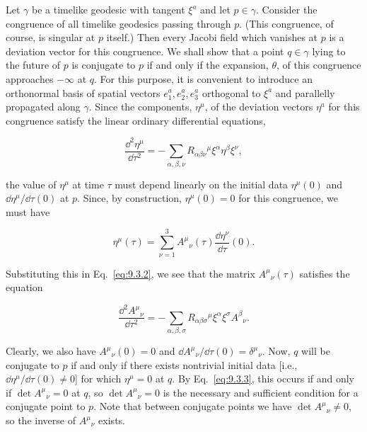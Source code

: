 Let \(\gamma\) be a timelike geodesic with tangent \(\xi^a\) and let \(p\in\gamma\).
Consider the congruence of all timelike geodesics passing through \(p\). (This
congruence, of course, is singular at \(p\) itself.) Then every Jacobi field which
vanishes at \(p\) is a deviation vector for this congruence. We shall show that a
point \(q\in\gamma\) lying to the future of \(p\) is conjugate to \(p\) if and only if the
expansion, \(\theta\), of this congruence approaches \(-\infty\) at \(q\). For this purpose,
it is convenient to introduce an orthonormal basis of spatial vectors
\(e_1^a,e_2^a,e_3^a\) orthogonal to \(\xi^a\) and parallelly propagated along \(\gamma\).
Since the components, \(\eta^\mu\), of the deviation vectors \(\eta^a\) for this
congruence satisfy the linear ordinary differential equations,

\begin{equation}
  \frac{\dd^2\eta^\mu}{\dd\tau^2}
  =-\sum_{\alpha,\beta,\nu}
    R_{\alpha\beta\nu}{}^\mu\xi^\alpha\eta^\beta\xi^\nu ,
  \tag{9.3.2}\label{eq:9.3.2}
\end{equation}

the value of \(\eta^\mu\) at time \(\tau\) must depend linearly on the initial data
\(\eta^\mu(0)\) and \(\dd\eta^\mu/\dd\tau(0)\) at \(p\). Since, by construction,
\(\eta^\mu(0)=0\) for this congruence, we must have

\begin{equation}
  \eta^\mu(\tau)
  =\sum_{\nu=1}^3 A^\mu{}_\nu(\tau)\frac{\dd\eta^\nu}{\dd\tau}(0) .
  \tag{9.3.3}\label{eq:9.3.3}
\end{equation}

Substituting this in Eq.~\eqref{eq:9.3.2}, we see that the matrix
\(A^\mu{}_\nu(\tau)\) satisfies the equation

\begin{equation}
  \frac{\dd^2 A^\mu{}_\nu}{\dd\tau^2}
  =-\sum_{\alpha,\beta,\sigma}
    R_{\alpha\beta\sigma}{}^\mu\xi^\alpha\xi^\sigma A^\beta{}_\nu .
  \tag{9.3.4}\label{eq:9.3.4}
\end{equation}

Clearly, we also have \(A^\mu{}_\nu(0)=0\) and
\(\dd A^\mu{}_\nu/\dd\tau(0)=\delta^\mu{}_\nu\). Now, \(q\) will be conjugate to
\(p\) if and only if there exists nontrivial initial data [i.e.,
\(\dd\eta^\mu/\dd\tau(0)\ne0\)] for which \(\eta^\mu=0\) at \(q\). By
Eq.~\eqref{eq:9.3.3}, this occurs if and only if \(\det A^\mu{}_\nu=0\) at \(q\), so
\(\det A^\mu{}_\nu=0\) is the necessary and sufficient condition for a conjugate point
to \(p\). Note that between conjugate points we have \(\det A^\mu{}_\nu\ne0\), so the
inverse of \(A^\mu{}_\nu\) exists.

